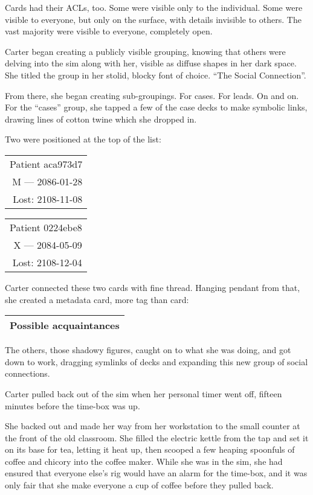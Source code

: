 Cards had their ACLs, too. Some were visible only to the individual. Some were visible to everyone, but only on the surface, with details invisible to others. The vast majority were visible to everyone, completely open.

Carter began creating a publicly visible grouping, knowing that others were delving into the sim along with her, visible as diffuse shapes in her dark space. She titled the group in her stolid, blocky font of choice. ``The Social Connection''.

From there, she began creating sub-groupings. For cases. For leads. On and on. For the ``cases'' group, she tapped a few of the case decks to make symbolic links, drawing lines of cotton twine which she dropped in.

Two were positioned at the top of the list:

\begin{longtable}[]{@{}r@{}}
\toprule
\endhead
Patient aca973d7\tabularnewline
M — 2086-01-28\tabularnewline
Lost: 2108-11-08\tabularnewline
\bottomrule
\end{longtable}

\begin{longtable}[]{@{}r@{}}
\toprule
\endhead
Patient 0224ebe8\tabularnewline
X — 2084-05-09\tabularnewline
Lost: 2108-12-04\tabularnewline
\bottomrule
\end{longtable}

Carter connected these two cards with fine thread. Hanging pendant from that, she created a metadata card, more tag than card:

\begin{longtable}[]{@{}l@{}}
\toprule
\endhead
Possible acquaintances\tabularnewline
\bottomrule
\end{longtable}

The others, those shadowy figures, caught on to what she was doing, and got down to work, dragging symlinks of decks and expanding this new group of social connections.

Carter pulled back out of the sim when her personal timer went off, fifteen minutes before the time-box was up.

She backed out and made her way from her workstation to the small counter at the front of the old classroom. She filled the electric kettle from the tap and set it on its base for tea, letting it heat up, then scooped a few heaping spoonfuls of coffee and chicory into the coffee maker. While she was in the sim, she had ensured that everyone else's rig would have an alarm for the time-box, and it was only fair that she make everyone a cup of coffee before they pulled back.

